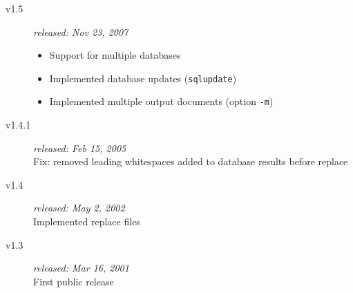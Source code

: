 \documentclass{article}
\begin{document}
\begin{description}
\item[v1.5] \textit{released: Nov 23, 2007}
\begin{itemize}
\item Support for multiple databases
\item Implemented database updates (\texttt{sqlupdate})
\item Implemented multiple output documents (option \texttt{-m})
\end{itemize}

\item[v1.4.1] \textit{released: Feb 15, 2005}\\
Fix: removed leading whitespaces added to database results before replace

\item[v1.4] \textit{released: May 2, 2002}\\
Implemented replace files

\item[v1.3] \textit{released: Mar 16, 2001}\\
First public release

\end{description}
\end{document}

